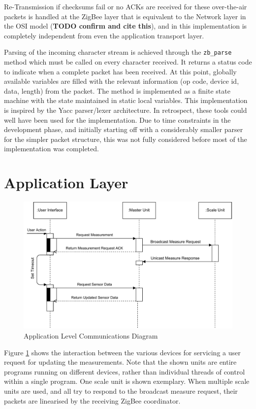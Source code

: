 Re-Transmission if checksums fail or no ACKs are received for these over-the-air packets is handled at the ZigBee layer that is equivalent to the Network layer in the OSI model (\textbf{TODO confirm and cite this}), and in this implementation is completely independent from even the application transport layer.

Parsing of the incoming character stream is achieved through the \texttt{zb\_parse} method which must be called on every character received. It returns a status code to indicate when a complete packet has been received. At this point, globally available variables are filled with the relevant information (op code, device id, data, length) from the packet. The method is implemented as a finite state machine with the state maintained in static local variables. This implementation is inspired by the Yacc parser/lexer architecture\cite{yacc}. In retrospect, these tools could well have been used for the implementation. Due to time constraints in the development phase, and initially starting off with a considerably smaller parser for the simpler packet structure, this was not fully considered before most of the implementation was completed. 

\section{Application Layer}

\begin{figure}
\includegraphics[width=\textwidth]{images/communications-diagram.pdf}
\caption{Application Level Communications Diagram}
\label{communications-diagram}
\end{figure}

Figure \ref{communications-diagram} shows the interaction between the various devices for servicing a user request for updating the measurements. Note that the shown units are entire programs running on different devices, rather than individual threads of control within a single program. One scale unit is shown exemplary. When multiple scale units are used, and all try to respond to the broadcast measure request, their packets are linearised by the receiving ZigBee coordinator.

